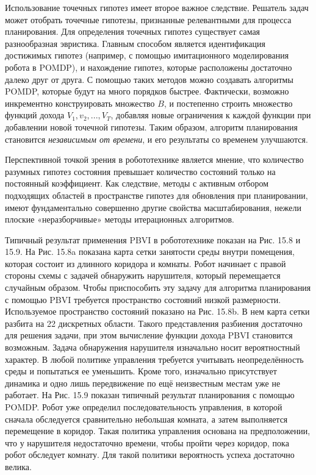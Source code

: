 \documentclass[10pt,a4paper]{article}
\begin{document}
Использование точечных гипотез имеет второе важное следствие. Решатель задач может отобрать точечные гипотезы, признанные релевантными для процесса планирования. Для определения точечных гипотез существует самая разнообразная эвристика. Главным способом является идентификация достижимых гипотез (например, с помощью имитационного моделирования робота в POMDP), и нахождение гипотез, которые расположены достаточно далеко друг от друга. С помощью таких методов можно создавать алгоритмы POMDP, которые будут на много порядков быстрее. Фактически, возможно инкрементно конструировать множество $B$, и постепенно строить множество функций дохода $V_1, v_2,..., V_T$, добавляя новые ограничения к каждой функции при добавлении новой точечной гипотезы. Таким образом, алгоритм планирования становится \textit{независимым от времени}, и его результаты со временем улучшаются.

Перспективной точкой зрения в робототехнике является мнение, что количество разумных гипотез состояния превышает количество состояний только на постоянный коэффициент. Как следствие, методы с активным отбором подходящих областей в пространстве гипотез для обновления при планировании, имеют фундаментально совершенно другие свойства масштабирования, нежели плоские «неразборчивые» методы итерационных алгоритмов.

Типичный результат применения PBVI в робототехнике показан на Рис. 15.8 и 15.9. На Рис. 15.8a показана карта сетки занятости среды внутри помещения, которая состоит из длинного коридора и комнаты. Робот начинает с правой стороны схемы с задачей обнаружить нарушителя, который перемещается случайным образом. Чтобы приспособить эту задачу для алгоритма планирования с помощью PBVI требуется пространство состояний низкой размерности. Используемое пространство состояний показано на Рис. 15.8b. В нем карта сетки разбита на 22 дискретных области. Такого представления разбиения достаточно для решения задачи, при этом вычисление функции дохода PBVI становится возможным. Задача обнаружения нарушителя изначально носит вероятностный характер. В любой политике управления требуется учитывать неопределённость среды и попытаться ее уменьшить. Кроме того, изначально присутствует динамика и одно лишь передвижение по ещё неизвестным местам уже не работает. На Рис. 15.9 показан типичный результат планирования с помощью POMDP. Робот уже определил последовательность управления, в которой сначала обследуется сравнительно небольшая комната, а затем выполняется перемещение в коридор. Такая политика управления основана на предположении, что у нарушителя недостаточно времени, чтобы пройти через коридор, пока робот обследует комнату. Для такой политики вероятность успеха достаточно велика.
\end{document}
